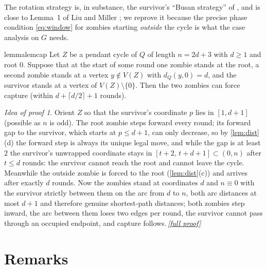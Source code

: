 \documentclass[11pt,a4paper]{article}
\theoremstyle{plain}
\theoremstyle{definition}
\theoremstyle{remark}
\newtheorem*{proofidea}{Idea of proof}
\newcommand{\fullproofref}[1]{\,\hyperref[#1]{\textit{[full proof]}}}
\newcommand{\dist}{d}
\begin{document}
The rotation strategy is, in substance, the survivor's ``Busan strategy'' of \cite[Section~3]{BBBLN21}, and is close to Lemma~1 of Liu and Miller \cite{LM26}; we reprove it because the precise phase condition \eqref{eq:window} for zombies starting \emph{outside} the cycle is what the case analysis on $G$ needs.

\begin{restatable}{lemma}{lemcap}\label{lem:cap}
Let $Z$ be a pendant cycle of $Q$ of length $n=2d+3$ with $d\ge1$ and root $0$. Suppose that at the start of some round one zombie stands at the root, a second zombie stands at a vertex $y\notin V(Z)$ with $\dist_Q(y,0)=d$, and the survivor stands at a vertex of $V(Z)\setminus\{0\}$. Then the two zombies can force capture (within $d+\lceil d/2\rceil+1$ rounds).
\end{restatable}

\begin{proofidea}
Orient $Z$ so that the survivor's coordinate $p$ lies in $[1,d+1]$ (possible as $n$ is odd). The root zombie steps forward every round; its forward gap to the survivor, which starts at $p\le d+1$, can only decrease, so by \cref{lem:dist}(d) the forward step is always its unique legal move, and while the gap is at least $2$ the survivor's unwrapped coordinate stays in $[t+2,\,t+d+1]\subset(0,n)$ after $t\le d$ rounds: the survivor cannot reach the root and cannot leave the cycle. Meanwhile the outside zombie is forced to the root (\cref{lem:dist}(c)) and arrives after exactly $d$ rounds. Now the zombies stand at coordinates $d$ and $n\equiv0$ with the survivor strictly between them on the arc from $d$ to $n$, both arc distances at most $d+1$ and therefore genuine shortest-path distances; both zombies step inward, the arc between them loses two edges per round, the survivor cannot pass through an occupied endpoint, and capture follows.\fullproofref{pf:cap}
\end{proofidea}

\section{Remarks}
\end{document}
